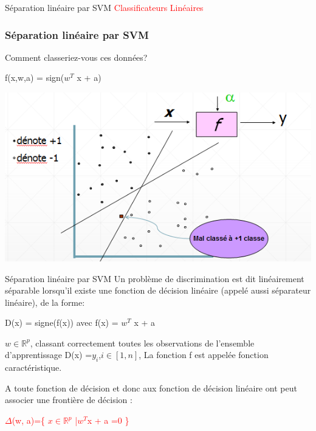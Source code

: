\documentclass{bredelebeamer}
\begin{document}
\begin{frame}{Séparation linéaire par SVM}
\textcolor{red}{Classificateurs Linéaires}
 
    \frametitle{Séparation linéaire par SVM }
    \begin{minipage}{0.3\textwidth}
        Comment classeriez-vous ces données?\vspace{2\baselineskip}
        
        
        f(x,w,a) = sign($w^{T}$ x + a)
    \end{minipage}
    \begin{minipage}{0.3\textwidth}
        \includegraphics[scale=0.55]{9.png}
    \end{minipage}
\end{frame}

\begin{frame}{Séparation linéaire par SVM}
Un problème de discrimination est dit linéairement séparable lorsqu’il existe une fonction de décision linéaire (appelé aussi séparateur linéaire), de la forme:

\begin{center} D(x) = signe(f(x)) avec  f(x) = $w^{T}$ x + a  \end{center}


$ w\in\mathbb{R}^{p} $, classant correctement toutes les observations de l’ensemble d’apprentissage
D(x) =$y_{i}$,$ {i}\in[1,n] $, La fonction f est appelée fonction caractéristique.\vspace{2\baselineskip}


A toute fonction de décision et donc aux fonction de décision linéaire ont peut associer une frontière de décision :
 
\begin{center} \textcolor{red} {$\Delta$(w, a)=\{ $ x\in\mathbb{R}^{p} $ |$ w^{T}$x + a =0 \}} \end{center}                                       
\end{frame}
\end{document}
